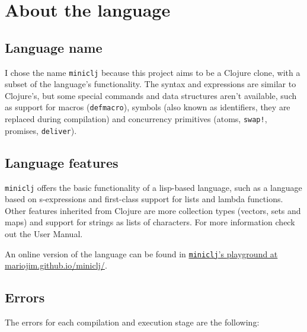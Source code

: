 \documentclass[11pt]{scrreprt}
\begin{document}
\chapter{About the language}
\section{Language name}
I chose the name \texttt{miniclj} because this project aims to be a Clojure clone, with a subset of the language's functionality. The syntax and expressions are similar to Clojure's, but some special commands and data structures aren't available, such as support for macros (\texttt{defmacro}), symbols (also known as identifiers, they are replaced during compilation) and concurrency primitives (atoms, \texttt{swap!}, promises, \texttt{deliver}).

\section{Language features}
\texttt{miniclj} offers the basic functionality of a lisp-based language, such as a language based on s-expressions and first-class support for lists and lambda functions. Other features inherited from Clojure are more collection types (vectors, sets and maps) and support for strings as lists of characters. For more information check out the User Manual.

An online version of the language can be found in \href{https://mariojim.github.io/miniclj/}{\texttt{miniclj}'s playground at mariojim.github.io/miniclj/}.

\section{Errors}
The errors for each compilation and execution stage are the following:
\end{document}
